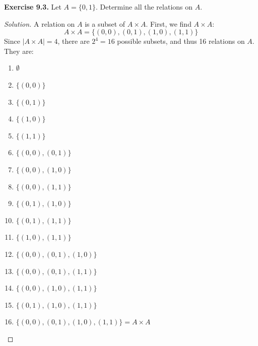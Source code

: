 \documentclass[11pt, a4paper]{article}
\theoremstyle{definition}
\theoremstyle{remark}
\begin{document}
\vspace{1em}
\textbf{Exercise 9.3.} Let $A = \{0, 1\}$. Determine all the relations on $A$.
\begin{proof}[Solution]
A relation on $A$ is a subset of $A \times A$. First, we find $A \times A$:
\[ A \times A = \{ (0,0), (0,1), (1,0), (1,1) \} \]
Since $|A \times A| = 4$, there are $2^4 = 16$ possible subsets, and thus 16 relations on $A$. They are:
\begin{enumerate}[label=\arabic*., itemsep=0pt]
    \item $\emptyset$
    \item $\{(0,0)\}$
    \item $\{(0,1)\}$
    \item $\{(1,0)\}$
    \item $\{(1,1)\}$
    \item $\{(0,0), (0,1)\}$
    \item $\{(0,0), (1,0)\}$
    \item $\{(0,0), (1,1)\}$
    \item $\{(0,1), (1,0)\}$
    \item $\{(0,1), (1,1)\}$
    \item $\{(1,0), (1,1)\}$
    \item $\{(0,0), (0,1), (1,0)\}$
    \item $\{(0,0), (0,1), (1,1)\}$
    \item $\{(0,0), (1,0), (1,1)\}$
    \item $\{(0,1), (1,0), (1,1)\}$
    \item $\{(0,0), (0,1), (1,0), (1,1)\} = A \times A$
\end{enumerate}
\end{proof}
\end{document}
